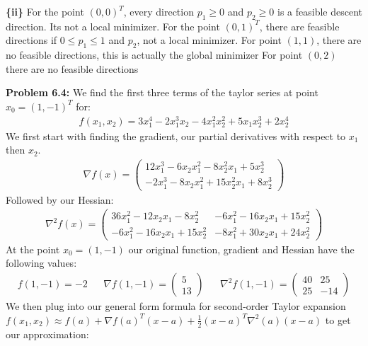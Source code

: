 \documentclass{article}
\begin{document}
\indent \textbf{\{ii\}} \newline For the point $(0,0)^T$, every direction $p_1 \geq 0$ and $p_2 \geq 0$ is a feasible descent direction. Its not a local minimizer. \newline
For the point $(0,1)^T$, there are feasible directions if $0 \leq p_1 \leq 1$ and $p_2 $, not a local minimizer. \newline
For point $(1,1)$, there are no feasible directions, this is actually the global minimizer \newline
For point $(0,2)$ there are no feasible directions  \newline

\noindent
\textbf{Problem 6.4:} We find the first three terms of the taylor series at point $x_0 = (1,-1)^T$ for:
\begin{align*}
    f(x_1, x_2) = 3x_1^4 - 2x_1^3x_2 - 4x_1^2x_2^2 + 5x_1x_2^3 + 2x_2^4
\end{align*}
We first start with finding the gradient, our partial derivatives with respect to $x_1$ then $x_2$.
\begin{align*}
    \nabla f(x) = 
    \begin{pmatrix}
        12x_1^3 - 6x_2x_1^2 - 8x_2^2x_1 + 5x_2^3 \\
        -2x_1^3 - 8x_2x_1^2 + 15x_2^2x_1 + 8x_2^3
    \end{pmatrix}
\end{align*}
Followed by our Hessian: 
\begin{align*}
    \nabla^2 f(x) = 
    \begin{pmatrix}
        36 x_1^2 - 12 x_2 x_1 - 8 x_2^2 & -6 x_1^2 - 16 x_2 x_1 + 15 x_2^2 \\
        -6 x_1^2 - 16 x_2 x_1 + 15 x_2^2 & -8 x_1^2 + 30 x_2 x_1 + 24 x_2^2
    \end{pmatrix}
\end{align*}
At the point $x_0 = (1,-1)$ our original function, gradient and Hessian have the following values:
\begin{align*}
    f(1,-1) = -2 && 
    \nabla f(1,-1) =
    \begin{pmatrix}
        5 \\ 13
    \end{pmatrix} &&
    \nabla^2 f(1,-1) = 
    \begin{pmatrix}
        40 & 25 \\
        25 & -14
    \end{pmatrix}
\end{align*}
We then plug into our general form formula for second-order Taylor expansion \newline $f(x_1, x_2) \approx f(a) + \nabla f(a)^T (x-a)+\frac{1}{2}(x-a)^T \nabla^2 (a)(x-a)$ to get our approximation:
\end{document}
